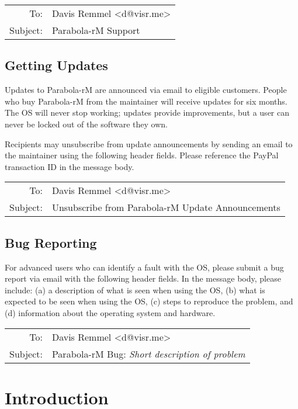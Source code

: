 \documentclass{memoir}
\begin{document}
\vspace{0.5cm}
\begin{tabular}{rl}
To:& Davis Remmel \textless d@visr.me\textgreater \\
Subject:& Parabola-rM Support
\end{tabular}


\section{Getting Updates}

Updates to Parabola-rM are announced via email to eligible customers. People who buy Parabola-rM from the maintainer will receive updates for six months. The OS will never stop working; updates provide improvements, but a user can never be locked out of the software they own.

Recipients may unsubscribe from update announcements by sending an email to the maintainer using the following header fields. Please reference the PayPal transaction ID in the message body.

\vspace{0.5cm}
\begin{tabular}{rl}
To:& Davis Remmel \textless d@visr.me\textgreater \\
Subject:& Unsubscribe from Parabola-rM Update Announcements
\end{tabular}


\section{Bug Reporting}

For advanced users who can identify a fault with the OS, please submit a bug report via email with the following header fields. In the message body, please include: (a) a description of what is seen when using the OS, (b) what is expected to be seen when using the OS, (c) steps to reproduce the problem, and (d) information about the operating system and hardware.

\vspace{0.5cm}
\begin{tabular}{rl}
To:& Davis Remmel \textless d@visr.me\textgreater \\
Subject:& Parabola-rM Bug: \textit{Short description of problem}
\end{tabular}



\setcounter{chapter}{0}
\renewcommand{\thechapter}{\arabic{chapter}}
\chapter{Introduction}
\setcounter{page}{1}
\end{document}
